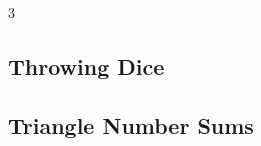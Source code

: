 \documentclass[8pt]{extarticle}
\begin{document}
\begin{multicols*}{3}
\subsection{Throwing Dice}
\begin{caixaenunciado}

\end{caixaenunciado}
\vspace{0.3cm}


\subsection{Triangle Number Sums}
\begin{caixaenunciado}

\end{caixaenunciado}
\vspace{0.3cm}

\end{multicols*}
\pagebreak
\end{document}
